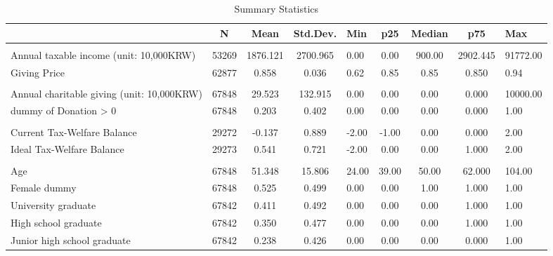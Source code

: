 \documentclass[
  11pt,
  a4paper,
]{article}
\begin{document}
  \begin{table}

  \caption{\label{tab:SummaryCovariate}Summary Statistics}
  \centering
  \fontsize{7}{9}\selectfont
  \begin{tabular}[t]{lccclcccl}
  \toprule
   & N & Mean & Std.Dev. & Min & p25 & Median & p75 & Max\\
  \midrule
  \addlinespace[0.3em]
  \multicolumn{9}{l}{\textbf{Income and Giving Price}}\\
  \hspace{1em}Annual taxable income (unit: 10,000KRW) & 53269 & 1876.121 & 2700.965 & 0.00 & 0.00 & 900.00 & 2902.445 & 91772.00\\
  \hspace{1em}Giving Price & 62877 & 0.858 & 0.036 & 0.62 & 0.85 & 0.85 & 0.850 & 0.94\\
  \addlinespace[0.3em]
  \multicolumn{9}{l}{\textbf{Charitable Donations}}\\
  \hspace{1em}Annual charitable giving (unit: 10,000KRW) & 67848 & 29.523 & 132.915 & 0.00 & 0.00 & 0.00 & 0.000 & 10000.00\\
  \hspace{1em}dummy of Donation > 0 & 67848 & 0.203 & 0.402 & 0.00 & 0.00 & 0.00 & 0.000 & 1.00\\
  \addlinespace[0.3em]
  \multicolumn{9}{l}{\textbf{Government Efficiency}}\\
  \hspace{1em}Current Tax-Welfare Balance & 29272 & -0.137 & 0.889 & -2.00 & -1.00 & 0.00 & 0.000 & 2.00\\
  \hspace{1em}Ideal Tax-Welfare Balance & 29273 & 0.541 & 0.721 & -2.00 & 0.00 & 0.00 & 1.000 & 2.00\\
  \addlinespace[0.3em]
  \multicolumn{9}{l}{\textbf{Individual Characteristics}}\\
  \hspace{1em}Age & 67848 & 51.348 & 15.806 & 24.00 & 39.00 & 50.00 & 62.000 & 104.00\\
  \hspace{1em}Female dummy & 67848 & 0.525 & 0.499 & 0.00 & 0.00 & 1.00 & 1.000 & 1.00\\
  \hspace{1em}University graduate & 67842 & 0.411 & 0.492 & 0.00 & 0.00 & 0.00 & 1.000 & 1.00\\
  \hspace{1em}High school graduate & 67842 & 0.350 & 0.477 & 0.00 & 0.00 & 0.00 & 1.000 & 1.00\\
  \hspace{1em}Junior high school graduate & 67842 & 0.238 & 0.426 & 0.00 & 0.00 & 0.00 & 0.000 & 1.00\\
  \bottomrule
  \end{tabular}
  \end{table}
\end{document}
